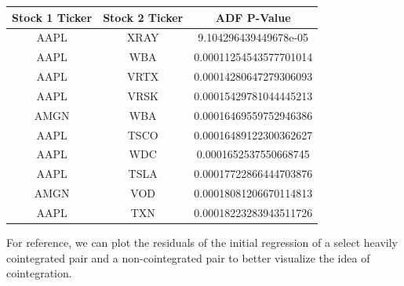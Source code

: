 \documentclass{article}
\begin{document}
\begin{spacing}{2.0}
\begin{table}[H]
    \centering
    \begin{tabular}{|c|c|c|}
        \hline
        \textbf{Stock 1 Ticker} & \textbf{Stock 2 Ticker} & \textbf{ADF P-Value} \\ \hline
        AAPL & XRAY & 9.104296439449678e-05 \\ \hline
        AAPL & WBA & 0.00011254543577701014 \\ \hline
        AAPL & VRTX & 0.00014280647279306093 \\ \hline
        AAPL & VRSK & 0.00015429781044445213 \\ \hline
        AMGN & WBA & 0.00016469559752946386 \\ \hline
        AAPL & TSCO & 0.00016489122300362627 \\ \hline
        AAPL & WDC & 0.0001652537550668745 \\ \hline
        AAPL & TSLA & 0.00017722866444703876 \\ \hline
        AMGN & VOD & 0.00018081206670114813 \\ \hline
        AAPL & TXN & 0.00018223283943511726 \\ \hline
    \end{tabular}
\end{table}

For reference, we can plot the residuals of the initial regression of a select heavily cointegrated
pair and a non-cointegrated pair to better visualize the idea of cointegration.


\end{spacing}
\end{document}
